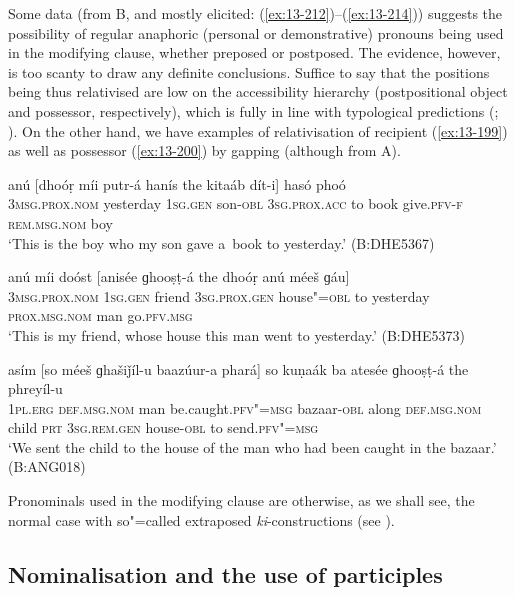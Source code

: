 Some data (from B, and mostly elicited: (\ref{ex:13-212})--(\ref{ex:13-214})) suggests the possibility of regular anaphoric (personal or demonstrative) pronouns being used in the modifying clause, whether preposed or postposed. The evidence, however, is too scanty to draw any definite conclusions. Suffice to say that the positions being thus relativised are low on the accessibility hierarchy (postpositional object and possessor, respectively), which is fully in line with typological predictions (\citealt[147--148]{keenan1985}; \citealt[226]{andrews_relative2007}). On the other hand, we have examples of relativisation of recipient (\ref{ex:13-199}) as well as possessor (\ref{ex:13-200}) by gapping (although from A).

\begin{exe}
\ex
\label{ex:13-212}
\gll anú [dhoóṛ míi putr-á hanís the  kitaáb dít-i] hasó phoó  \\
\textsc{3msg.prox.nom} yesterday \textsc{1sg.gen} son-\textsc{obl} \textsc{3sg.prox.acc} to  book give.\textsc{pfv-f} \textsc{rem.msg.nom} boy \\
\glt `This is the boy who my son gave a~book to yesterday.' (B:DHE5367)

\ex
\label{ex:13-213}
\gll anú míi doóst [anisée ɡhooṣṭ-á the  dhoóṛ anú méeš ɡáu] \\
\textsc{3msg.prox.nom} \textsc{1sg.gen} friend \textsc{3sg.prox.gen} house"=\textsc{obl} to  yesterday \textsc{prox.msg.nom} man go.\textsc{pfv.msg} \\
\glt `This is my friend, whose house this man went to yesterday.' (B:DHE5373)

\ex
\label{ex:13-214}
\gll asím [so méeš ɡhašiǰíl-u baazúur-a  phará] so kuṇaák ba atesée
ɡhooṣṭ-á  the phreyíl-u \\
\textsc{1pl.erg} \textsc{def.msg.nom} man be.caught.\textsc{pfv"=msg} bazaar-\textsc{obl}  along \textsc{ def.msg.nom} child \textsc{prt} \textsc{3sg.rem.gen} house-\textsc{obl} to send.\textsc{pfv"=msg} \\
\glt `We sent the child to the house of the man who had been caught in the bazaar.' (B:ANG018) 
\end{exe}

Pronominals used in the modifying clause are otherwise, as we shall see, the normal case with so"=called extraposed \textit{ki}-constructions (see ). 


\subsection{Nominalisation and the use of participles}
\label{subsec:13-6-6}

